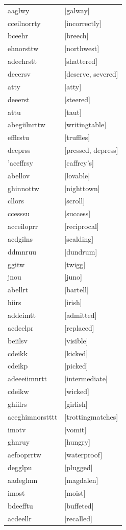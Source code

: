 \documentclass{article}
\begin{document}
\begin{tabular}{ll}
aaglwy & [galway] \\
cceilnorrty & [incorrectly] \\
bceehr & [breech] \\
ehnorsttw & [northwest] \\
adeehrstt & [shattered] \\
deeersv & [deserve, severed] \\
atty & [atty] \\
deeerst & [steered] \\
attu & [taut] \\
abegiilnrttw & [writingtable] \\
efflrstu & [truffles] \\
deeprss & [pressed, depress] \\
'aceffrsy & [caffrey's] \\
abellov & [lovable] \\
ghinnottw & [nighttown] \\
cllors & [scroll] \\
ccesssu & [success] \\
acceiloprr & [reciprocal] \\
acdgilns & [scalding] \\
ddmnruu & [dundrum] \\
ggitw & [twigg] \\
jnou & [juno] \\
abellrt & [bartell] \\
hiirs & [irish] \\
addeimtt & [admitted] \\
acdeelpr & [replaced] \\
beiilsv & [visible] \\
cdeikk & [kicked] \\
cdeikp & [picked] \\
adeeeiimnrtt & [intermediate] \\
cdeikw & [wicked] \\
ghiilrs & [girlish] \\
aceghimnorstttt & [trottingmatches] \\
imotv & [vomit] \\
ghnruy & [hungry] \\
aefooprrtw & [waterproof] \\
degglpu & [plugged] \\
aadeglmn & [magdalen] \\
imost & [moist] \\
bdeefftu & [buffeted] \\
acdeellr & [recalled] \\

\end{tabular}
\end{document}
